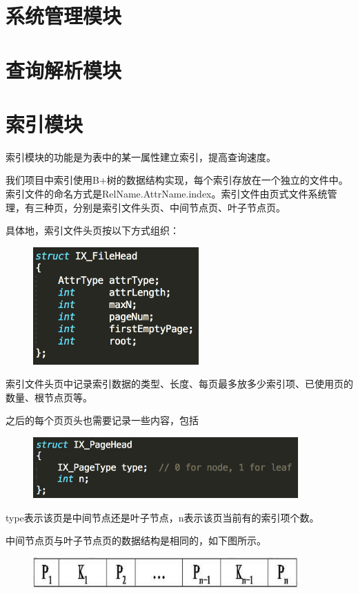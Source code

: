 \section{系统管理模块}

\section{查询解析模块}

\section{索引模块}
索引模块的功能是为表中的某一属性建立索引，提高查询速度。

我们项目中索引使用B+树的数据结构实现，每个索引存放在一个独立的文件中。索引文件的命名方式是RelName.AttrName.index。索引文件由页式文件系统管理，有三种页，分别是索引文件头页、中间节点页、叶子节点页。

具体地，索引文件头页按以下方式组织：
\begin{figure}[H]
\centering
\includegraphics[width=2.5in]{Figures/IX_FileHead.png}
\end{figure}

 索引文件头页中记录索引数据的类型、长度、每页最多放多少索引项、已使用页的数量、根节点页等。

 之后的每个页页头也需要记录一些内容，包括
 \begin{figure}[H]
\centering
\includegraphics[width=4in]{Figures/IX_PageHead.png}
\end{figure}

type表示该页是中间节点还是叶子节点，n表示该页当前有的索引项个数。

中间节点页与叶子节点页的数据结构是相同的，如下图所示。
\begin{figure}[H]
\centering
\includegraphics[width=4in]{Figures/indexstruct.png}
\end{figure}


